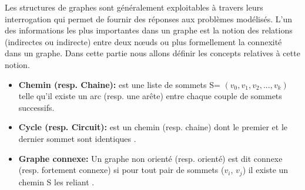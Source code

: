  
 
Les structures de graphes sont généralement exploitables à travers leurs interrogation qui permet de fournir des réponses aux problèmes modélisés. L'un des informations les plus importantes dans un graphe est la notion des relations (indirectes ou indirecte) entre deux nœuds ou plus formellement la connexité dans un graphe. Dans cette partie nous allons définir les concepts relatives à cette notion.
 \begin{itemize} [label = $\bullet$]
			 \item \textbf{Chemin (resp. Chaine):}
			est une liste de sommets S= $(v_{0},v_{1},v_{2},...,v_{k})$ telle qu’il existe un arc (resp. une arête) entre chaque couple de sommets successifs.
			 
			 
			  \item \textbf{Cycle (resp. Circuit):} 
			 est un chemin (resp. chaine) dont le premier et le dernier sommet sont identiques \citep{DUT}.
			 
			 \item \textbf{Graphe connexe:}
			Un graphe non orienté (resp. orienté) est dit connexe (resp. fortement connexe) si pour tout pair de sommets ($v_{i}$, $v_{j}$) il existe un chemin S les reliant \citep{muller}.
		
		\end{itemize}